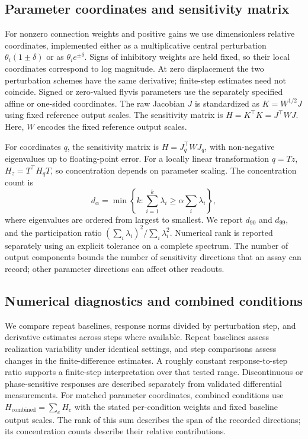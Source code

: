 \documentclass[11pt,letterpaper]{article}
\begin{document}
\subsection*{Parameter coordinates and sensitivity matrix}
For nonzero connection weights and positive gains we use dimensionless relative coordinates, implemented either as a multiplicative central perturbation $\theta_i(1\pm\delta)$ or as $\theta_i e^{\pm\delta}$. Signs of inhibitory weights are held fixed, so their local coordinates correspond to log magnitude. At zero displacement the two perturbation schemes have the same derivative; finite-step estimates need not coincide. Signed or zero-valued flyvis parameters use the separately specified affine or one-sided coordinates. The raw Jacobian $J$ is standardized as $K=W^{1/2}J$ using fixed reference output scales. The sensitivity matrix is $H=K^{\top}K=J^{\top}WJ$. Here, $W$ encodes the fixed reference output scales.

For coordinates $q$, the sensitivity matrix is $H=J_q^{\top}WJ_q$, with non-negative eigenvalues up to floating-point error. For a locally linear transformation $q=Tz$, $H_z=T^{\top}H_qT$, so concentration depends on parameter scaling. The concentration count is
\[
d_\alpha=\min\left\{k:\sum_{i=1}^{k}\lambda_i\ge\alpha\sum_i\lambda_i\right\},
\]
where eigenvalues are ordered from largest to smallest. We report $d_{90}$ and $d_{99}$, and the participation ratio $(\sum_i\lambda_i)^2/\sum_i\lambda_i^2$. Numerical rank is reported separately using an explicit tolerance on a complete spectrum. The number of output components bounds the number of sensitivity directions that an assay can record; other parameter directions can affect other readouts.

\subsection*{Numerical diagnostics and combined conditions}
We compare repeat baselines, response norms divided by perturbation step, and derivative estimates across steps where available. Repeat baselines assess realization variability under identical settings, and step comparisons assess changes in the finite-difference estimates. A roughly constant response-to-step ratio supports a finite-step interpretation over that tested range. Discontinuous or phase-sensitive responses are described separately from validated differential measurements. For matched parameter coordinates, combined conditions use $H_{\mathrm{combined}}=\sum_c H_c$ with the stated per-condition weights and fixed baseline output scales. The rank of this sum describes the span of the recorded directions; its concentration counts describe their relative contributions.
\end{document}
